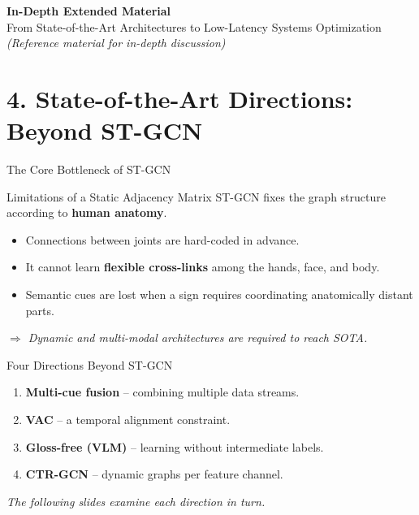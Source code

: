 \documentclass[aspectratio=169]{beamer}
\begin{document}

\begin{frame}
    \centering
    {\Large \textbf{In-Depth Extended Material}}\\[0.35cm]
    \normalsize From State-of-the-Art Architectures to Low-Latency Systems Optimization\\[0.2cm]
    \footnotesize\textit{(Reference material for in-depth discussion)}
\end{frame}

\section{4. State-of-the-Art Directions: Beyond ST-GCN}
\begin{frame}{The Core Bottleneck of ST-GCN}
    \begin{alertblock}{Limitations of a Static Adjacency Matrix}
        ST-GCN fixes the graph structure according to \textbf{human anatomy}.
    \end{alertblock}
    \vspace{0.4cm}
    \begin{itemize}
        \item Connections between joints are hard-coded in advance.
        \item It cannot learn \textbf{flexible cross-links} among the hands, face, and body.
        \item Semantic cues are lost when a sign requires coordinating anatomically distant parts.
    \end{itemize}
    \vspace{0.3cm}
    \centering\textit{$\Rightarrow$ Dynamic and multi-modal architectures are required to reach SOTA.}
\end{frame}

\begin{frame}{Four Directions Beyond ST-GCN}
    \begin{enumerate}
        \item \textbf{Multi-cue fusion} -- combining multiple data streams.
        \vspace{0.2cm}
        \item \textbf{VAC} -- a temporal alignment constraint.
        \vspace{0.2cm}
        \item \textbf{Gloss-free (VLM)} -- learning without intermediate labels.
        \vspace{0.2cm}
        \item \textbf{CTR-GCN} -- dynamic graphs per feature channel.
    \end{enumerate}
    \vspace{0.4cm}
    \centering\small\textit{The following slides examine each direction in turn.}
\end{frame}
\end{document}
